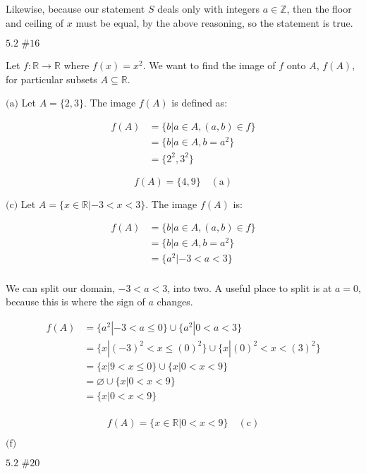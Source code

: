 \documentclass{article}
\newcommand{\problem}[2]{$\boxed{\text{#1 \##2}}$}
\newcommand{\subproblem}[1]{$\boxed{\text{(#1)}}$}
\newcommand{\subsolution}[2]{\boxed{#2\quad(\text{#1})}}
\newcommand{\multistep}[1]{\begin{array}{rl} #1 \end{array}}
\begin{document}
Likewise, because our statement $S$ deals only with integers
$a\in\mathbb{Z}$, then the floor and ceiling of $x$ must be equal, by
the above reasoning, so the statement is true.

%
\problem{5.2}{16}

Let $f:\mathbb{R}\rightarrow\mathbb{R}$ where $f(x)=x^2$. We want to
find the image of $f$ onto $A$, $f(A)$, for particular subsets
$A\subseteq\mathbb{R}$.

%
\subproblem{a} Let $A=\{2,3\}$. The image $f(A)$ is defined as:

\[
\multistep{
f(A)&=\{b|a\in A, (a,b)\in f\} \\
&=\{b|a\in A, b=a^2\} \\
&=\{2^2, 3^2\}
}
\]

\[
\subsolution{a}{f(A)=\{4,9\}}
\]

%
\subproblem{c} Let $A=\{x\in\mathbb{R}|-3<x<3\}$. The image $f(A)$ is:

\[
\multistep{
f(A)&=\{b|a\in A, (a,b)\in f\} \\
&=\{b|a\in A, b=a^2\} \\
&=\{a^2|-3<a<3\} \\
}
\]

We can split our domain, $-3<a<3$, into two. A useful place to split
is at $a=0$, because this is where the sign of $a$ changes.

\[
\multistep{
f(A)&=\{a^2|-3<a\le 0\}\cup\{a^2|0<a<3\} \\
&=\{x|(-3)^2<x\le (0)^2\}\cup\{x|(0)^2<x<(3)^2\} \\
&=\{x|9<x\le 0\}\cup\{x|0<x<9\} \\
&=\varnothing\cup\{x|0<x<9\} \\
&=\{x|0<x<9\} \\
}
\]

\[
\subsolution{c}{f(A)=\{x\in\mathbb{R}|0<x<9\}}
\]

%
\subproblem{f}

%
\problem{5.2}{20}
\end{document}
